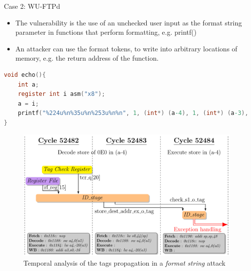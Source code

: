 \begin{frame}{Case 2: WU-FTPd}
    \begin{itemize}
        \justifying
        \item The vulnerability is the use of an unchecked user input as the format string parameter in functions that perform formatting, e.g. printf()
        \item An attacker can use the format tokens, to write into arbitrary locations of memory, e.g. the return address of the function.
    \end{itemize}

    \centering
    \begin{minipage}[c]{\textwidth}
        \begin{lstlisting}[language=C,label=code:printfNFormat]
void echo(){
    int a;
    register int i asm("x8");
    a = i;
    printf("%224u%n%35u%n%253u%n%n", 1, (int*) (a-4), 1, (int*) (a-3), 1, (int*) (a-2), (int*) (a-1));
}\end{lstlisting}
    \end{minipage}
\end{frame}

\begin{frame}[noframenumbering]{}
    \begin{figure}
        \centering
        \includegraphics[height=.85\textheight]{src/2_vuln_assessment/img/wuftpd/ftpd_short.pdf}
        \caption{Temporal analysis of the tags propagation in a \textit{format string} attack}
        \label{fig:analyseTempoFormatString}
    \end{figure}
\end{frame}

